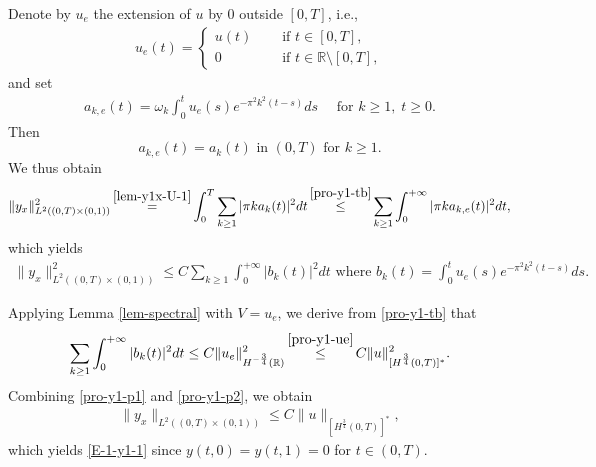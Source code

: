 \documentclass[11pt, reqno]{amsart}
\theoremstyle{plain}
\numberwithin{equation}{section}
\newcommand{\be}{\begin{equation}}
\newcommand{\ee}{\end{equation}}
\newcommand{\mR}{\mathbb{R}}
\begin{document}
Denote by $u_e$ the extension of $u$ by 0 outside $[0, T]$, i.e., 
\begin{align} \label{pro-y1-ue}
	u_e(t) = \begin{cases}
	u(t)		 \quad &\text{ if } t \in [0, T], 	\\
	0		\quad &\text{ if } t \in \mR \setminus [0, T], 
	\end{cases}
\end{align}
and set
\begin{align} \label{pro-y1-tb-p1}
a_{k, e} (t) = \omega_k \int_0^t u_e(s) e^{-  \pi^2 k^2 (t - s)} ds  \quad \text{ for } k \geq 1, \;   t \ge 0.
\end{align}
Then
\be\label{pro-y1-tb}
a_{k, e} (t) = a_k (t) \mbox{ in } (0, T) \mbox{ for } k \ge 1.
\ee
We thus obtain 
\begin{align*}
	\|y_{x} \|_{L^2((0, T) \times (0, 1))}^2 \mathop{=}^{\eqref{lem-y1x-U-1}} \int_0^T \sum_{k \geq 1} |\pi k a_k(t)|^2 dt 
	\mathop{\leq}^{\eqref{pro-y1-tb}}	 \sum_{k \geq 1} \int_0^{+\infty} |\pi k a_{k, e} (t)|^2 dt, 
\end{align*}
which yields 
\begin{align}\label{pro-y1-p1}
	\|y_{x} \|_{L^2((0, T) \times (0, 1))}^2  \le C \sum_{k \geq 1} \int_0^{+\infty} |b_k(t)|^2 dt \mbox{ where } b_k(t) = \int_0^t u_e(s) e^{-  \pi^2 k^2 (t - s)} ds. 
\end{align}

Applying  Lemma \ref{lem-spectral} with $V = u_e$, we derive from  \eqref{pro-y1-tb} that
\begin{align}\label{pro-y1-p2}
	\sum_{k \geq 1} \int_0^{+\infty} |b_{k} (t)|^2 dt \le  C \|u_e \|_{H^{-\frac{3}{4}}(\mR)}^2 \mathop{\le}^{\eqref{pro-y1-ue}} C \|u\|_{[H^{\frac{3}{4}}(0, T)]^*}^2. 
\end{align}
Combining \eqref{pro-y1-p1} and  \eqref{pro-y1-p2}, we obtain
\begin{align}	\label{E-1-y1-1'}
	\|y_x \|_{L^2((0, T) \times (0, 1))} \leq C \|u\|_{[H^{\frac{3}{4}}(0, T)]^*}, 
\end{align}
which yields \eqref{E-1-y1-1} since $y(t, 0) = y(t, 1) = 0$ for $t \in (0, T)$. 

\medskip
\end{document}
